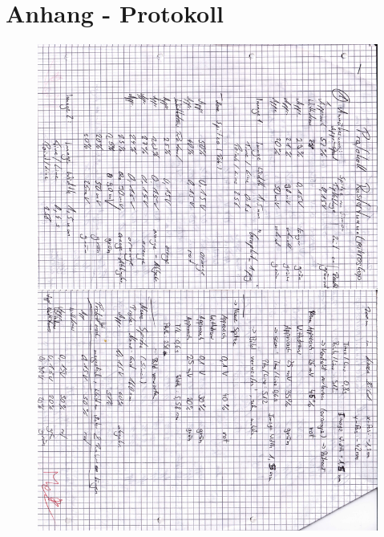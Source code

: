 \section{Anhang - Protokoll}

\begin{appendix}
 
\begin{figure}[H]
\centering \includegraphics[width=\textwidth]{Bilder/Protokoll/001.png}
\end{figure}  
\begin{figure}[H]

\end{figure}
\end{appendix}
